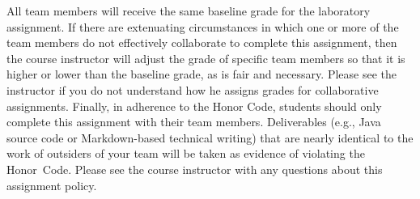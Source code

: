 \documentclass[11pt]{article}
\begin{document}
All team members will receive the same baseline grade for the laboratory assignment. If there are extenuating
circumstances in which one or more of the team members do not effectively collaborate to complete this assignment, then
the course instructor will adjust the grade of specific team members so that it is higher or lower than the baseline
grade, as is fair and necessary. Please see the instructor if you do not understand how he assigns grades for
collaborative assignments. Finally, in adherence to the Honor Code, students should only complete this assignment with
their team members. Deliverables (e.g., Java source code or Markdown-based technical writing) that are nearly identical
to the work of outsiders of your team will be taken as evidence of violating the \mbox{Honor Code}. Please see the
course instructor with any questions about this assignment policy.
\end{document}
